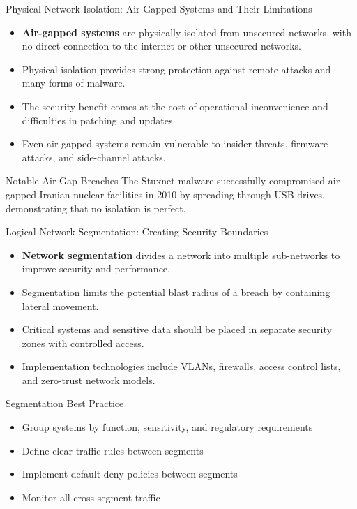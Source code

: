 \documentclass{beamer}
\begin{document}
        \begin{frame}{Physical Network Isolation: Air-Gapped Systems and Their Limitations}
        \begin{itemize}
        \item \textbf{Air-gapped systems} are physically isolated from unsecured networks, with no direct connection to the internet or other unsecured networks.
        \item Physical isolation provides strong protection against remote attacks and many forms of malware.
        \item The security benefit comes at the cost of operational inconvenience and difficulties in patching and updates.
        \item Even air-gapped systems remain vulnerable to insider threats, firmware attacks, and side-channel attacks.
        \end{itemize}
        
        \begin{exampleblock}{Notable Air-Gap Breaches}
        The Stuxnet malware successfully compromised air-gapped Iranian nuclear facilities in 2010 by spreading through USB drives, demonstrating that no isolation is perfect.
        \end{exampleblock}
        \end{frame}
        
        \begin{frame}{Logical Network Segmentation: Creating Security Boundaries}
        \begin{itemize}
        \item \textbf{Network segmentation} divides a network into multiple sub-networks to improve security and performance.
        \item Segmentation limits the potential blast radius of a breach by containing lateral movement.
        \item Critical systems and sensitive data should be placed in separate security zones with controlled access.
        \item Implementation technologies include VLANs, firewalls, access control lists, and zero-trust network models.
        \end{itemize}
        
        \begin{block}{Segmentation Best Practice}
        \begin{itemize}
        \item Group systems by function, sensitivity, and regulatory requirements
        \item Define clear traffic rules between segments
        \item Implement default-deny policies between segments
        \item Monitor all cross-segment traffic
        \end{itemize}
        \end{block}
        \end{frame}
\end{document}
